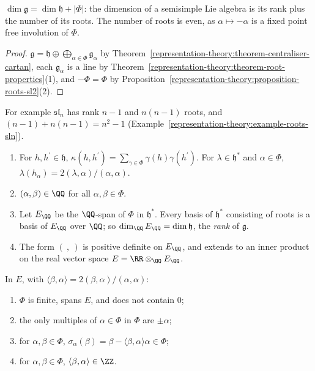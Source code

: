 \begin{corollary}\label{representation-theory:corollary-dimension}
$\dim\mathfrak{g} = \dim\mathfrak{h} + |\Phi|$: the dimension of a semisimple Lie algebra is its rank plus the number of its roots. The number of roots is even, as $\alpha \mapsto -\alpha$ is a
fixed point free involution of $\Phi$.
\end{corollary}

\begin{proof}
$\mathfrak{g} = \mathfrak{h} \oplus \bigoplus_{\alpha \in \Phi}\mathfrak{g}_\alpha$ by Theorem~\ref{representation-theory:theorem-centraliser-cartan}, each $\mathfrak{g}_\alpha$ is a line by
Theorem~\ref{representation-theory:theorem-root-properties}(1), and $-\Phi = \Phi$ by Proposition~\ref{representation-theory:proposition-roots-sl2}(2).
\end{proof}

For example $\mathfrak{sl}_n$ has rank $n - 1$ and $n(n - 1)$ roots, and $(n - 1) + n(n - 1) = n^2 - 1$ (Example~\ref{representation-theory:example-roots-sln}).

\begin{theorem}\label{representation-theory:theorem-root-system-of-g}
\begin{enumerate}
\item For $h, h^{\prime} \in \mathfrak{h}$, $\kappa(h, h^{\prime}) = \sum_{\gamma \in \Phi}\gamma(h)\gamma(h^{\prime})$. For $\lambda \in \mathfrak{h}^*$ and $\alpha \in \Phi$,
$\lambda(h_\alpha) = 2(\lambda, \alpha)/(\alpha, \alpha)$.
\item $(\alpha, \beta) \in \QQ$ for all $\alpha, \beta \in \Phi$.
\item Let $E_\QQ$ be the $\QQ$-span of $\Phi$ in $\mathfrak{h}^*$. Every basis of $\mathfrak{h}^*$ consisting of roots is a basis of $E_\QQ$ over $\QQ$; so
$\dim_\QQ E_\QQ = \dim\mathfrak{h}$, the \emph{rank} of $\mathfrak{g}$.
\item The form $(\ ,\ )$ is positive definite on $E_\QQ$, and extends to an inner product on the real vector space $E = \RR \otimes_\QQ E_\QQ$.
\end{enumerate}
In $E$, with $\langle\beta, \alpha\rangle = 2(\beta, \alpha)/(\alpha, \alpha)$:
\begin{enumerate}
\item[(R1)] $\Phi$ is finite, spans $E$, and does not contain $0$;
\item[(R2)] the only multiples of $\alpha \in \Phi$ in $\Phi$ are $\pm\alpha$;
\item[(R3)] for $\alpha, \beta \in \Phi$, $\sigma_\alpha(\beta) = \beta - \langle\beta, \alpha\rangle\alpha \in \Phi$;
\item[(R4)] for $\alpha, \beta \in \Phi$, $\langle\beta, \alpha\rangle \in \ZZ$.
\end{enumerate}
\end{theorem}

